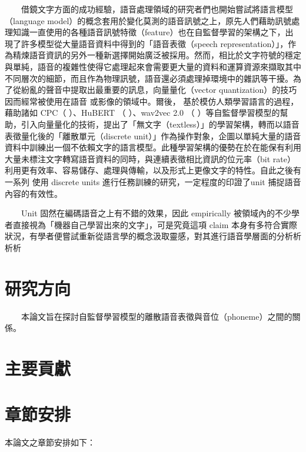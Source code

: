 　　借鏡文字方面的成功經驗，語音處理領域的研究者們也開始嘗試將語言模型（language model）的概念套用於變化莫測的語音訊號之上，原先人們藉助訊號處理知識一直使用的各種語音訊號特徵（feature）也在自監督學習的架構之下，出現了許多模型從大量語音資料中得到的「語音表徵（speech representation）」，作為精煉語音資訊的另外一種新選擇開始廣泛被採用。然而，相比於文字符號的穩定與單純，語音的複雜性使得它處理起來會需要更大量的資料和運算資源來擷取其中不同層次的細節，而且作為物理訊號，語音還必須處理掉環境中的雜訊等干擾。為了從紛亂的聲音中提取出最重要的訊息，向量量化（vector quantization）的技巧因而經常被使用在語音 \cite{chorowski2019unsupervised, chen2023vector, zhao2023speech} 或影像的領域中。爾後， \cite{lakhotia2021generative}  基於模仿人類學習語言的過程，藉助諸如 CPC（\cite{oord2019representation} ）、HuBERT （\cite{hsu2021hubert} ）、wav2vec 2.0 （\cite{baevski2020wav2vec} ）等自監督學習模型的幫助，引入向量量化的技術，提出了「無文字（textless）」的學習架構，轉而以語音表徵量化後的「離散單元（discrete unit）」作為操作對象，企圖以單純大量的語音資料中訓練出一個不依賴文字的語言模型。此種學習架構的優勢在於在能保有利用大量未標注文字轉寫語音資料的同時，與連續表徵相比資訊的位元率（bit rate）利用更有效率、容易儲存、處理與傳輸，以及形式上更像文字的特性。自此之後有一系列   使用 discrete units 進行任務訓練的研究，一定程度的印證了unit 捕捉語音內容的有效性。

　　Unit 固然在編碼語音之上有不錯的效果，因此 empirically 被領域內的不少學者直接視為「機器自己學習出來的文字」，可是究竟這項 claim 本身有多符合實際狀況，有學者便嘗試重新從語言學的概念汲取靈感，對其進行語音學層面的分析析析析 


\section{研究方向}

　　本論文旨在探討自監督學習模型的離散語音表徵與音位（phoneme）之間的關係。

\section{主要貢獻}
\section{章節安排}

本論文之章節安排如下：

